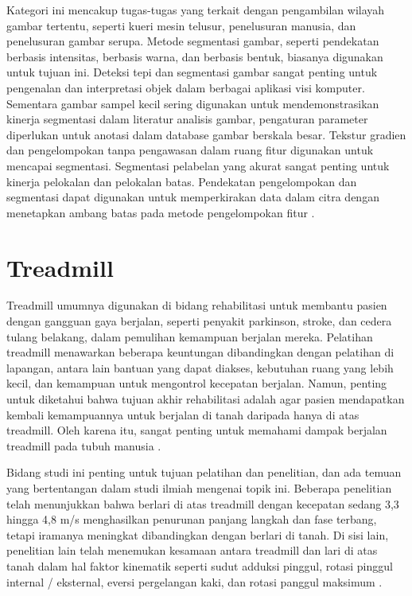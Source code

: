 Kategori ini mencakup tugas-tugas yang terkait dengan pengambilan wilayah gambar tertentu, seperti kueri mesin telusur, penelusuran manusia, dan penelusuran gambar serupa. Metode segmentasi gambar, seperti pendekatan berbasis intensitas, berbasis warna, dan berbasis bentuk, biasanya digunakan untuk tujuan ini. Deteksi tepi dan segmentasi gambar sangat penting untuk pengenalan dan interpretasi objek dalam berbagai aplikasi visi komputer. Sementara gambar sampel kecil sering digunakan untuk mendemonstrasikan kinerja segmentasi dalam literatur analisis gambar, pengaturan parameter diperlukan untuk anotasi dalam database gambar berskala besar. Tekstur gradien dan pengelompokan tanpa pengawasan dalam ruang fitur digunakan untuk mencapai segmentasi. Segmentasi pelabelan yang akurat sangat penting untuk kinerja pelokalan dan pelokalan batas. Pendekatan pengelompokan dan segmentasi dapat digunakan untuk memperkirakan data dalam citra dengan menetapkan ambang batas pada metode pengelompokan fitur \parencite{Kotappa}.


\section{Treadmill}
\label{sec:deteksigesturtubuh}

Treadmill umumnya digunakan di bidang rehabilitasi untuk membantu pasien dengan gangguan gaya berjalan, seperti penyakit parkinson, stroke, dan cedera tulang belakang, dalam pemulihan kemampuan berjalan mereka. Pelatihan treadmill menawarkan beberapa keuntungan dibandingkan dengan pelatihan di lapangan, antara lain bantuan yang dapat diakses, kebutuhan ruang yang lebih kecil, dan kemampuan untuk mengontrol kecepatan berjalan. Namun, penting untuk diketahui bahwa tujuan akhir rehabilitasi adalah agar pasien mendapatkan kembali kemampuannya untuk berjalan di tanah daripada hanya di atas treadmill. Oleh karena itu, sangat penting untuk memahami dampak berjalan treadmill pada tubuh manusia \parencite{Shi}.

Bidang studi ini penting untuk tujuan pelatihan dan penelitian, dan ada temuan yang bertentangan dalam studi ilmiah mengenai topik ini. Beberapa penelitian telah menunjukkan bahwa berlari di atas treadmill dengan kecepatan sedang 3,3 hingga 4,8 m/s menghasilkan penurunan panjang langkah dan fase terbang, tetapi iramanya meningkat dibandingkan dengan berlari di tanah. Di sisi lain, penelitian lain telah menemukan kesamaan antara treadmill dan lari di atas tanah dalam hal faktor kinematik seperti sudut adduksi pinggul, rotasi pinggul internal / eksternal, eversi pergelangan kaki, dan rotasi panggul maksimum \parencite{Pakbaz}.


